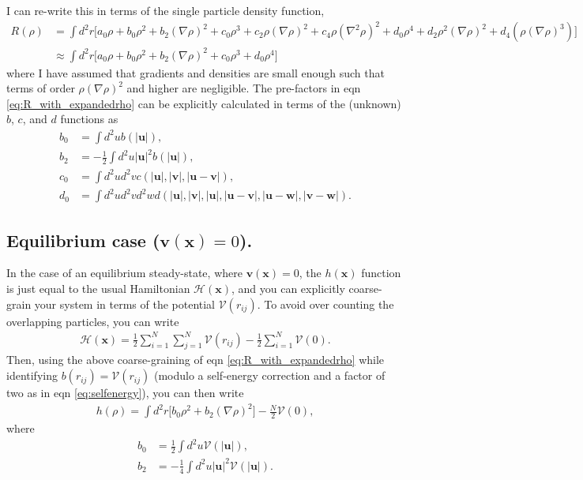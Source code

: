 \documentclass{article}
\begin{document}
I can re-write this in terms of the single particle density function,
\begin{align}\label{eq:R_with_expandedrho}
  R(\rho) &= \int d^2r\big[ a_0\rho + b_0\rho^2 + b_2 (\nabla\rho)^2
            + c_0 \rho^3 + c_2\rho(\nabla\rho)^2 + c_4\rho(\nabla^2\rho)^2
            + d_0 \rho^4 + d_2\rho^2(\nabla\rho)^2 + d_4(\rho(\nabla\rho)^3)\big]\nonumber\\
          &\approx \int d^2r\big[a_0\rho + b_0\rho^2+b_2(\nabla\rho)^2+c_0\rho^3+d_0\rho^4\big]
\end{align}
where I have assumed that gradients and densities are small enough such that terms of
order $\rho(\nabla\rho)^2$ and higher are negligible. The pre-factors in eqn
\ref{eq:R_with_expandedrho} can be explicitly calculated in terms of the (unknown)
$b$, $c$, and $d$ functions as
\begin{align}
  b_0 & = \int d^2u b(|\bm{u}|),\\
  b_2 & = -\frac{1}{2}\int d^2u |\bm{u}|^2b(|\bm{u}|),\\
  c_0 & = \int d^2ud^2vc(|\bm{u}|,|\bm{v}|,|\bm{u}-\bm{v}|),\\
  d_0 & = \int d^2ud^2vd^2w d(|\bm{u}|,|\bm{v}|,|\bm{u}|,|\bm{u}-\bm{v}|,
        |\bm{u}-\bm{w}|,|\bm{v}-\bm{w}|).
\end{align}

\subsection{Equilibrium case ($\bm{v}(\bm{x})=0$).}
In the case of an equilibrium steady-state, where $\bm{v}(\bm{x})=0$, the $h(\bm{x})$ function is
just equal to the usual Hamiltonian $\mathcal{H}(\bm{x})$, and you can explicitly coarse-grain your
system in terms of the potential $\mathcal{V}(r_{ij})$. To avoid over counting the overlapping
particles, you can write
\begin{align}\label{eq:selfenergy}
  \mathcal{H}(\bm{x}) = \frac{1}{2}\sum_{i=1}^N\sum_{j=1}^N\mathcal{V}(r_{ij})
  -\frac{1}{2}\sum_{i=1}^N\mathcal{V}(0).
\end{align}
Then, using the above coarse-graining of eqn \ref{eq:R_with_expandedrho} while identifying
$b(r_{ij})=\mathcal{V}(r_{ij})$ (modulo a self-energy correction and a factor of two as in
eqn \ref{eq:selfenergy}), you can then write
\begin{align}
  h(\rho) = \int d^2r\big[ b_0\rho^2 + b_2 (\nabla\rho)^2\big]-\frac{N}{2}\mathcal{V}(0),
\end{align}
where
\begin{align}
  b_0 & = \frac{1}{2}\int d^2u \mathcal{V}(|\bm{u}|),\\
  b_2 & = -\frac{1}{4}\int d^2u |\bm{u}|^2 \mathcal{V}(|\bm{u}|).
\end{align}
\end{document}
